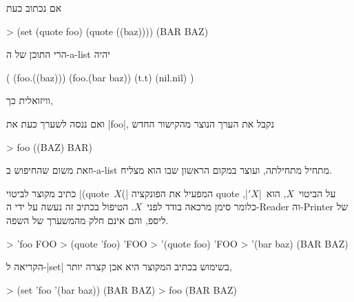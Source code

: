 \minipage\textwidth
אם נכתוב כעת
\begin{LISP}
> (set (quote foo) (quote ((baz))))
(BAR BAZ)
\end{LISP}
הרי התוכן של ה-a-list יהיה
\begin{LISP}
(
  (foo.((baz)))
  (foo.(bar baz))
  (t.t)
  (nil.nil)
)
\end{LISP}
\endminipage

וויזואלית כך,
\begin{LTR}
\end{LTR}

ואם ננסה לשערך כעת את \T|foo|, נקבל את הערך הנוצר מהקישור החדש
\begin{LISP}
> foo
((BAZ) BAR)
\end{LISP}
וזאת משום שהחיפוש ב-a-list מתחיל מתחילתה, ועוצר במקום הראשון שבו הוא מצליח.

כתיב מקוצר לביטוי \E|(quote~$X$(| המפעיל את הפונקציה quote על הביטוי~$X$,
הוא~\E|$'X$|, כלומר סימן מרכאה בודד לפני~$X$. הטיפול בכתיב זה נעשה על ידי
ה-Reader וה-Printer של ליספ, והם אינם חלק מהמשערך של השפה.
\begin{LISP}
> 'foo
FOO
> (quote 'foo)
'FOO
> '(quote foo)
'FOO
> '(bar baz)
(BAR BAZ)
\end{LISP}

הקריאה ל-\E|set| בשימוש בכתיב המקוצר היא אכן קצרה יותר,
\begin{LISP}
> (set 'foo '(bar baz))
(BAR BAZ)
> foo
(BAR BAZ)
\end{LISP}

